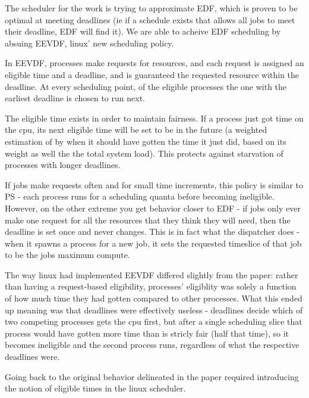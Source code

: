 The scheduler for the work is trying to approximate EDF, which is proven to be
optimal at meeting deadlines (ie if a schedule exists that allows all jobs to
meet their deadline, EDF will find it). We are able to acheive EDF scheduling by
absuing EEVDF, linux' new scheduling policy.

In EEVDF, processes make requests for resources, and each request is assigned an
eligible time and a deadline, and is guaranteed the requested resource within
the deadline. At every scheduling point, of the eligible processes the one with
the earliest deadline is chosen to run next. 

The eligible time exists in order to maintain fairness. If a process just got
time on the cpu, its next eligible time will be set to be in the future (a
weighted estimation of by when it should have gotten the time it just did, based
on its weight as well the the total system load). This protects against
starvation of processes with longer deadlines.

If jobs make requests often and for small time increments, this policy is
similar to PS - each process runs for a scheduling quanta before becoming
ineligible. However, on the other extreme you get behavior closer to EDF - if
jobs only ever make one request for all the resources that they think they will
need, then the deadline is set once and never changes. This is in fact what the
dispatcher does - when it spawns a process for a new job, it sets the requested
timeslice of that job to be the jobs maximum compute. 

The way linux had implemented EEVDF differed slightly from the paper: rather
than having a request-based eligibility, processes' eligiblity was solely a
function of how much time they had gotten compared to other processes. What this
ended up meaning was that deadlines were effectively useless - deadlines decide
which of two competing processes gets the cpu first, but after a single
scheduling slice that process would have gotten more time than is stricly fair
(half that time), so it becomes ineligible and the second process runs,
regardless of what the respective deadlines were. 

Going back to the original behavior delineated in the paper required introducing
the notion of eligible times in the linux scheduler. 
